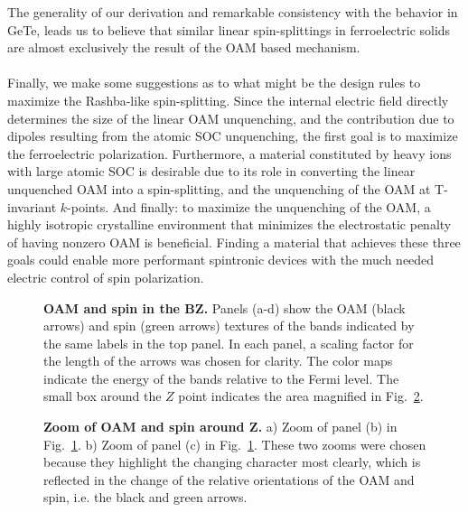 The generality of our derivation and remarkable consistency with the behavior in GeTe, leads us to believe that similar linear spin-splittings in ferroelectric solids are almost exclusively the result of the OAM based mechanism.
\\\\
Finally, we make some suggestions as to what might be the design rules to maximize the Rashba-like spin-splitting.
Since the internal electric field directly determines the size of the linear OAM unquenching, and the contribution due to dipoles resulting from the atomic SOC unquenching, the first goal is to maximize the ferroelectric polarization.
Furthermore, a material constituted by heavy ions with large atomic SOC is desirable due to its role in converting the linear unquenched OAM into a spin-splitting, and the unquenching of the OAM at T-invariant $k$-points.
And finally: to maximize the unquenching of the OAM, a highly isotropic crystalline environment that minimizes the electrostatic penalty of having nonzero OAM is beneficial.
Finding a material that achieves these three goals could enable more performant spintronic devices with the much needed electric control of spin polarization.
\begin{figure}
	\centering
  \caption{\label{fig:Rashba_textures}{\bf OAM and spin in the BZ.} Panels (a-d) show the OAM (black arrows) and spin (green arrows) textures of the bands indicated by the same labels in the top panel. In each panel, a scaling factor for the length of the arrows was chosen for clarity. The color maps indicate the energy of the bands relative to the Fermi level. The small box around the $Z$ point indicates the area magnified in Fig.~\ref{fig:Rashba_textures_small}.}
\end{figure}
\begin{figure}
	\centering
  \caption{\label{fig:Rashba_textures_small}{\bf Zoom of OAM and spin around Z.} a) Zoom of panel (b) in Fig.~\ref{fig:Rashba_textures}. b) Zoom of panel (c) in Fig.~\ref{fig:Rashba_textures}.  These two zooms were chosen because they highlight the changing character most clearly, which is reflected in the change of the relative orientations of the OAM and spin, i.e. the black and green arrows.}
\end{figure}
